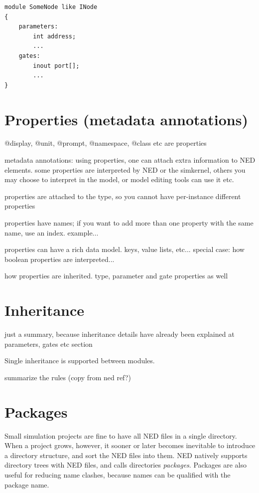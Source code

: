 \begin{Verbatim}
module SomeNode like INode
{
    parameters:
        int address;
        ...
    gates:
        inout port[];
        ...
}
\end{Verbatim}



\section{Properties (metadata annotations)}

@display, @unit, @prompt, @namespace, @class etc are properties

metadata annotations: using properties, one can attach extra information
to NED elements. some properties are interpreted by NED or the simkernel,
others you may choose to interpret in the model, or model editing tools
can use it etc.

properties are attached to the type, so you cannot have per-instance different
properties

properties have names; if you want to add more than one property with the
same name, use an index.  example...

properties can have a rich data model. keys, value lists, etc...
special case: how boolean properties are interpreted...

how properties are inherited. type, parameter and gate properties as well



\section{Inheritance}
\label{sec:ch-ned-lang:inheritance}

just a summary, because inheritance details have already been explained
at parameters, gates etc section

Single inheritance is supported between modules.

summarize the rules (copy from ned ref?)



\section{Packages}

Small simulation projects are fine to have all NED files in a single
directory. When a project grows, however, it sooner or later becomes
inevitable to introduce a directory structure, and sort the NED files into
them. NED natively supports directory trees with NED files, and calls
directories \textit{packages}. Packages are also useful for reducing
name clashes, because names can be qualified with the package name.

